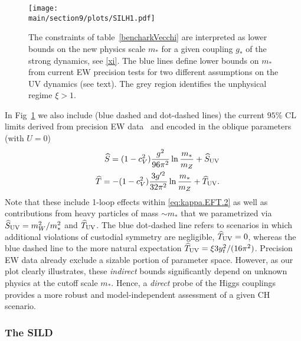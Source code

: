 \begin{figure}[t]
\begin{center}
\texttt{[image: \\main/section9/plots/SILH1.pdf]}
\caption{The constraints of table~\ref{bencharkVecchi} are interpreted as lower bounds on the new physics scale $m_*$ for a given coupling $g_*$ of the strong dynamics, see \eqref{xi}. The blue lines define lower bounds on $m_*$ from current EW precision tests for two different assumptions on the UV dynamics (see text). The grey region identifies the unphysical regime $\xi>1$. 
}\label{SILH}
\end{center}
\end{figure}



In Fig~\ref{SILH} we also include (blue dashed and dot-dashed lines) the current $95\%$ CL limits derived from precision EW data~\cite{Baak:2014ora} and encoded in the oblique parameters (with $U=0$)
\begin{eqnarray}
&&{\widehat S}=(1-c_V^2)\frac{g^2}{96\pi^2}\ln\frac{m_*}{m_Z}+{\widehat S}_{\rm UV}%
\\\nonumber
&&{\widehat T}=-(1-c_V^2)\frac{3g'^2}{32\pi^2}\ln\frac{m_*}{m_Z}+{\widehat T}_{\rm UV}.%
\end{eqnarray}
Note that these include 1-loop effects within \eqref{eq:kappa.EFT.2} as well as contributions from heavy particles of mass $\sim m_*$ that we parametrized via $\widehat S_{\rm UV}={m_W^2}/{m_*^2}$ and $\widehat T_{\rm UV}$. The blue dot-dashed line refers to scenarios in which additional violations of custodial symmetry are negligible, $\widehat T_{\rm UV}=0$, whereas the blue dashed line to the more natural expectation $\widehat T_{\rm UV}=\xi 3y_t^2/(16\pi^2)$. Precision EW data already exclude a sizable portion of parameter space. However, as our plot clearly illustrates, these {\emph{indirect}} bounds significantly depend on unknown physics at the cutoff scale $m_*$. Hence, a {\emph{direct}} probe of the Higgs couplings provides a more robust and model-independent assessment of a given CH scenario.








\subsubsection{The SILD}

